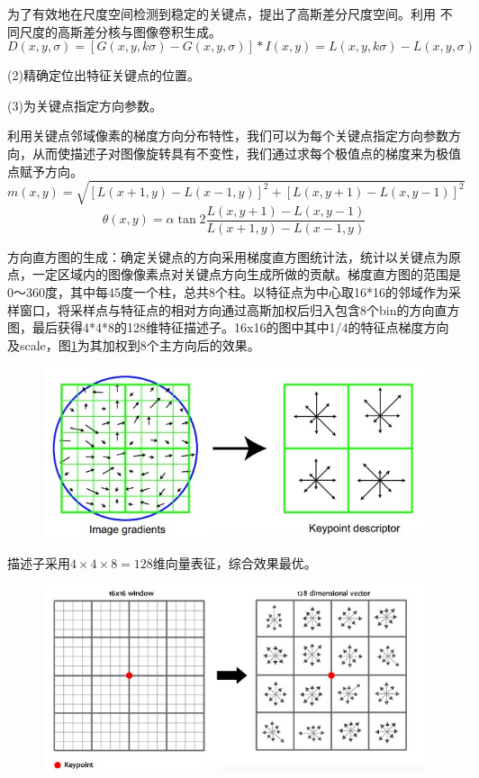 \documentclass[12pt]{article}
\begin{document}
    为了有效地在尺度空间检测到稳定的关键点，提出了高斯差分尺度空间。利用 不同尺度的高斯差分核与图像卷积生成。
    \begin{displaymath}
        D(x,y,\sigma)=[G(x,y,k\sigma)-G(x,y,\sigma)]*I(x,y)=L(x,y,k\sigma)-L(x,y,\sigma)
    \end{displaymath}
    
(2)精确定位出特征关键点的位置。

(3)为关键点指定方向参数。

利用关键点邻域像素的梯度方向分布特性，我们可以为每个关键点指定方向参数方向，从而使描述子对图像旋转具有不变性，我们通过求每个极值点的梯度来为极值点赋予方向。
\begin{displaymath}
    m(x,y)=\sqrt{[L(x+1,y)-L(x-1,y)]^{2}+[L(x,y+1)-L(x,y-1)]^{2}}
\end{displaymath}
\begin{displaymath}
    \theta(x,y)=\alpha\tan2\frac{L(x,y+1)-L(x,y-1)}{L(x+1,y)-L(x-1,y)}
\end{displaymath}

方向直方图的生成：确定关键点的方向采用梯度直方图统计法，统计以关键点为原点，一定区域内的图像像素点对关键点方向生成所做的贡献。梯度直方图的范围是0～360度，其中每45度一个柱，总共8个柱。以特征点为中心取16*16的邻域作为采样窗口，将采样点与特征点的相对方向通过高斯加权后归入包含8个bin的方向直方图，最后获得4*4*8的128维特征描述子。16x16的图中其中1/4的特征点梯度方向及scale，图\ref{fig:eight}为其加权到8个主方向后的效果。
        \begin{figure}
            \centering
            \includegraphics[width=0.5\linewidth]{sift1}
            \caption{}
            \label{fig:eight}
        \end{figure}
        
描述子采用$4×4×8=128$维向量表征，综合效果最优。
        \begin{figure}
            \centering
            \includegraphics[width=0.5\linewidth]{sift2}
        \end{figure}
\end{document}
